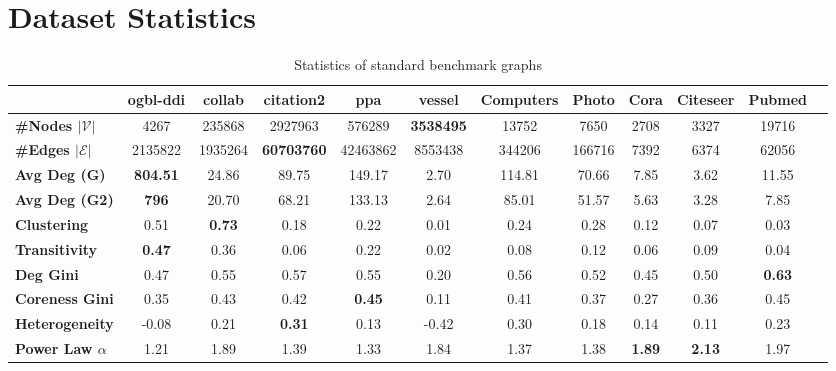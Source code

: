 \section{Dataset Statistics}
\begin{table*}[ht]
    \centering
    \caption{Statistics of standard benchmark graphs}
    \begin{adjustbox}{width=\textwidth}
    \begin{tabular}{lccccccccccc}
        \toprule 
        & \textbf{ogbl-ddi} & \textbf{collab} & \textbf{citation2} & \textbf{ppa} & \textbf{vessel} & \textbf{Computers} & \textbf{Photo} & \textbf{Cora} & \textbf{Citeseer} & \textbf{Pubmed} \\
        \midrule
        \textbf{\#Nodes $|\mathcal{V}|$} & 4267 & 235868 & 2927963 & 576289 & \textbf{3538495} & 13752 & 7650 & 2708 & 3327 & 19716 \\
        \textbf{\#Edges $|\mathcal{E}|$} & 2135822 & 1935264 & \textbf{60703760} & 42463862 & 8553438 & 344206 & 166716 & 7392 & 6374 & 62056 \\
        \textbf{Avg Deg (G)} & \textbf{804.51} & 24.86 & 89.75 & 149.17 & 2.70 & 114.81 & 70.66 & 7.85 & 3.62 & 11.55 \\
        \textbf{Avg Deg (G2)} & \textbf{796} & 20.70 & 68.21 & 133.13 & 2.64 & 85.01 & 51.57 & 5.63 & 3.28 & 7.85 \\
        \textbf{Clustering} & 0.51 & \textbf{0.73} & 0.18 & 0.22 & 0.01 & 0.24 & 0.28 & 0.12 & 0.07 & 0.03 \\
        \textbf{Transitivity} & \textbf{0.47} & 0.36 & 0.06 & 0.22 & 0.02 & 0.08 & 0.12 & 0.06 & 0.09 & 0.04 \\
        \textbf{Deg Gini} & 0.47 & 0.55 & 0.57 & 0.55 & 0.20 & 0.56 & 0.52 & 0.45 & 0.50 & \textbf{0.63} \\
        \textbf{Coreness Gini} & 0.35 & 0.43 & 0.42 & \textbf{0.45} & 0.11 & 0.41 & 0.37 & 0.27 & 0.36 & 0.45 \\
        \textbf{Heterogeneity} & -0.08 & 0.21 & \textbf{0.31} & 0.13 & -0.42 & 0.30 & 0.18 & 0.14 & 0.11 & 0.23 \\
        \textbf{Power Law $\alpha$} & 1.21 & 1.89 & 1.39 & 1.33 & 1.84 & 1.37 & 1.38 & \textbf{1.89} & \textbf{2.13} & 1.97 \\
        \bottomrule
    \end{tabular}
    \end{adjustbox}
    \label{tab:graph-stats}
\end{table*}


